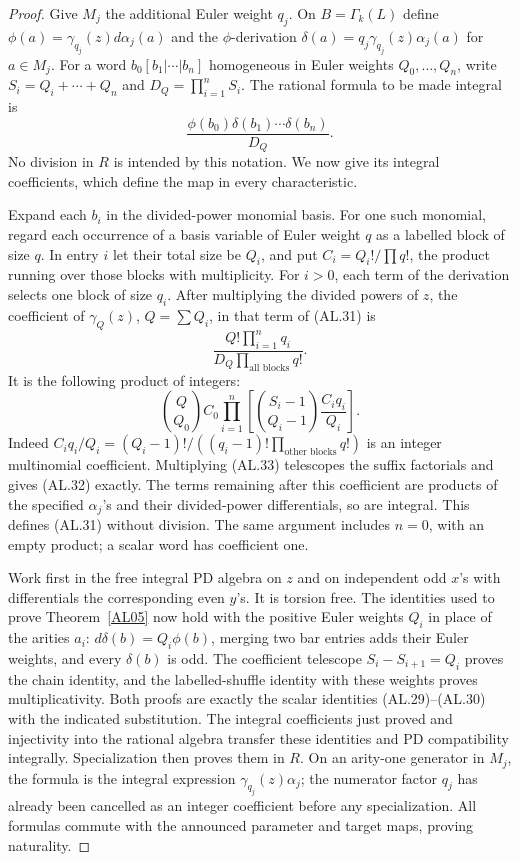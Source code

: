 \begin{proof}
Give $M_j$ the additional Euler weight $q_j$.
On $B=\Gamma_k(L)$ define
$\phi(a)=\gamma_{q_j}(z)d\alpha_j(a)$ and the
$\phi$-derivation
$\delta(a)=q_j\gamma_{q_j}(z)\alpha_j(a)$ for $a\in M_j$.
For a word $b_0[b_1|\cdots|b_n]$ homogeneous in
Euler weights $Q_0,\ldots,Q_n$, write
$S_i=Q_i+\cdots+Q_n$ and $D_Q=\prod_{i=1}^nS_i$.
The rational formula to be made integral is
\[
 \frac{\phi(b_0)\delta(b_1)\cdots\delta(b_n)}{D_Q}.
 \tag{AL.31}
\]
No division in $R$ is intended by this notation.
We now give its integral coefficients, which define
the map in every characteristic.

Expand each $b_i$ in the divided-power monomial basis.
For one such monomial, regard each occurrence of a
basis variable of Euler weight $q$ as a labelled
block of size $q$.  In entry $i$ let their total size
be $Q_i$, and put
$C_i=Q_i!/\prod q!$, the product running over those
blocks with multiplicity.  For $i>0$, each term of
the derivation selects one block of size $q_i$.
After multiplying the divided powers of $z$, the
coefficient of $\gamma_Q(z)$, $Q=\sum Q_i$, in
that term of \textup{(AL.31)} is
\[
 \frac{Q!\prod_{i=1}^nq_i}
      {D_Q\prod_{\text{all blocks}}q!}.
 \tag{AL.32}
\]
It is the following product of integers:
\[
 \binom{Q}{Q_0}C_0
 \prod_{i=1}^n
 \left[
   \binom{S_i-1}{Q_i-1}\frac{C_iq_i}{Q_i}
 \right].
 \tag{AL.33}
\]
Indeed
$C_iq_i/Q_i=(Q_i-1)!/
((q_i-1)!\prod_{\text{other blocks}}q!)$ is an
integer multinomial coefficient.  Multiplying
\textup{(AL.33)} telescopes the suffix factorials
and gives \textup{(AL.32)} exactly.
The terms remaining after this coefficient are
products of the specified $\alpha_j$'s and their
divided-power differentials, so are integral.
This defines \textup{(AL.31)} without division.
The same argument includes $n=0$, with an empty
product; a scalar word has coefficient one.

Work first in the free integral PD algebra on $z$
and on independent odd $x$'s with differentials the
corresponding even $y$'s.  It is torsion free.
The identities used to prove Theorem~\ref{AL05}
now hold with the positive Euler weights $Q_i$
in place of the arities $a_i$:
$d\delta(b)=Q_i\phi(b)$, merging two bar entries
adds their Euler weights, and every $\delta(b)$
is odd.  The coefficient telescope
$S_i-S_{i+1}=Q_i$ proves the chain identity, and
the labelled-shuffle identity with these weights
proves multiplicativity.  Both proofs are exactly
the scalar identities \textup{(AL.29)--(AL.30)}
with the indicated substitution.
The integral coefficients just proved and
injectivity into the rational algebra transfer
these identities and PD compatibility integrally.
Specialization then proves them in $R$.
On an arity-one generator in $M_j$, the formula
is the integral expression
$\gamma_{q_j}(z)\alpha_j$; the numerator factor
$q_j$ has already been cancelled as an integer
coefficient before any specialization.
All formulas commute with the announced parameter
and target maps, proving naturality.


\end{proof}
